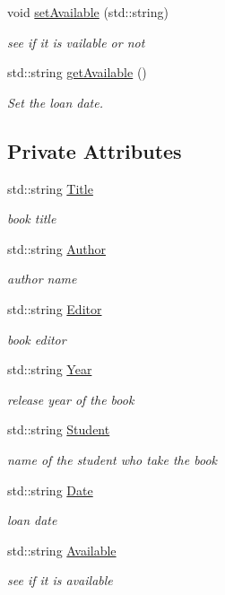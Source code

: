 \begin{DoxyCompactItemize}
void \hyperlink{classBook_a5077a2720ae494b0725a0b7baeb3e7f2}{set\+Available} (std\+::string)
\begin{DoxyCompactList}\small\item\em see if it is vailable or not \end{DoxyCompactList}\item 
std\+::string \hyperlink{classBook_a41d272a411cef781cbd44cb7eca9ac60}{get\+Available} ()
\begin{DoxyCompactList}\small\item\em Set the loan date. \end{DoxyCompactList}\end{DoxyCompactItemize}
\subsection*{Private Attributes}
\begin{DoxyCompactItemize}
\item 
std\+::string \hyperlink{classBook_a862b94a2fd16ac90209afa4393d8df8a}{Title}
\begin{DoxyCompactList}\small\item\em book title \end{DoxyCompactList}\item 
std\+::string \hyperlink{classBook_a12872f571d8e7c5bfa31f4142e7848eb}{Author}
\begin{DoxyCompactList}\small\item\em author name \end{DoxyCompactList}\item 
std\+::string \hyperlink{classBook_a18602b69a54cf1533569ac857681b03f}{Editor}
\begin{DoxyCompactList}\small\item\em book editor \end{DoxyCompactList}\item 
std\+::string \hyperlink{classBook_ad3fc2c944e788d179c4d836f36662ae2}{Year}
\begin{DoxyCompactList}\small\item\em release year of the book \end{DoxyCompactList}\item 
std\+::string \hyperlink{classBook_ae89daf9343a917dced86da884961ed3a}{Student}
\begin{DoxyCompactList}\small\item\em name of the student who take the book \end{DoxyCompactList}\item 
std\+::string \hyperlink{classBook_a45a1a5f93a5ec021cc605b0c905d1d6f}{Date}
\begin{DoxyCompactList}\small\item\em loan date \end{DoxyCompactList}\item 
std\+::string \hyperlink{classBook_ae5f0bbe5fb49a8cd68bfc77a59afed36}{Available}
\begin{DoxyCompactList}\small\item\em see if it is available \end{DoxyCompactList}\end{DoxyCompactItemize}


